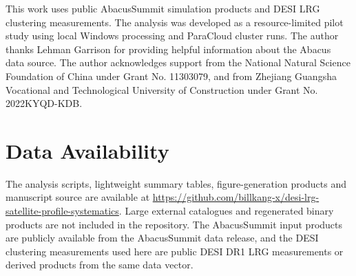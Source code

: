 \documentclass[fleqn,usenatbib]{mnras}
\begin{document}
This work uses public AbacusSummit simulation products and DESI LRG clustering measurements.  The analysis was developed as a resource-limited pilot study using local Windows processing and ParaCloud cluster runs.  The author thanks Lehman Garrison for providing helpful information about the Abacus data source.  The author acknowledges support from the National Natural Science Foundation of China under Grant No. 11303079, and from Zhejiang Guangsha Vocational and Technological University of Construction under Grant No. 2022KYQD-KDB.

\section*{Data Availability}

The analysis scripts, lightweight summary tables, figure-generation products and manuscript source are available at \url{https://github.com/billkang-x/desi-lrg-satellite-profile-systematics}.  Large external catalogues and regenerated binary products are not included in the repository.  The AbacusSummit input products are publicly available from the AbacusSummit data release, and the DESI clustering measurements used here are public DESI DR1 LRG measurements or derived products from the same data vector.




\label{lastpage}
\end{document}
